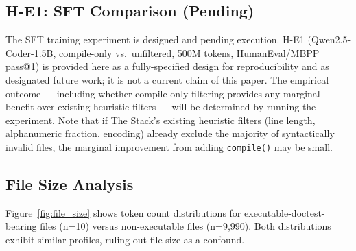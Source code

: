 \subsection{H-E1: SFT Comparison (Pending)}

The SFT training experiment is designed and pending execution. H-E1 (Qwen2.5-Coder-1.5B,
compile-only vs.\ unfiltered, 500M tokens, HumanEval/MBPP pass@1) is provided here as a
fully-specified design for reproducibility and as designated future work; it is not a current
claim of this paper. The empirical outcome --- including whether compile-only filtering provides
any marginal benefit over existing heuristic filters --- will be determined by running the
experiment. Note that if The Stack's existing heuristic filters (line length, alphanumeric
fraction, encoding) already exclude the majority of syntactically invalid files, the marginal
improvement from adding \texttt{compile()} may be small.

\subsection{File Size Analysis}

Figure~\ref{fig:file_size} shows token count distributions for executable-doctest-bearing
files (n=10) versus non-executable files (n=9,990). Both distributions exhibit similar
profiles, ruling out file size as a confound.
